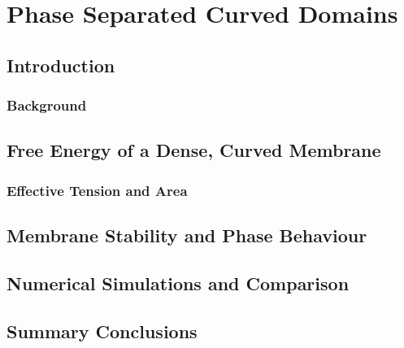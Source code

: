 \chapter{\label{ch:4-coupled}Phase Separated Curved Domains} 

\minitoc

\section{Introduction}
\subsection{Background}

\section{Free Energy of a Dense, Curved Membrane}
\subsection{Effective Tension and Area}

\section{Membrane Stability and Phase Behaviour}

\section{Numerical Simulations and Comparison}

\section{Summary Conclusions}
